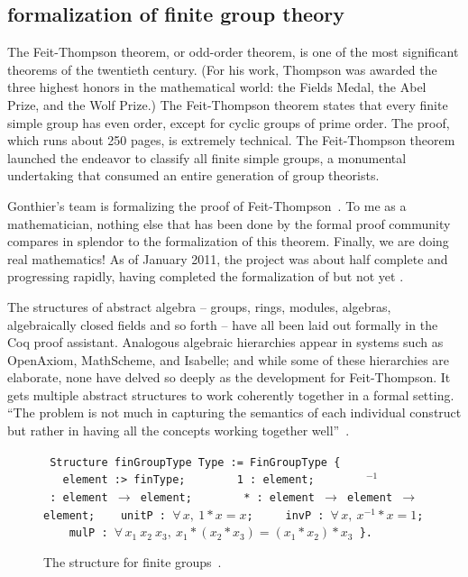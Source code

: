 \documentclass{llncs}
\begin{document}
\subsection{formalization of finite group theory}



The Feit-Thompson theorem, or odd-order theorem, is one of the most
significant theorems of the twentieth century.  (For his work,
Thompson was awarded the three highest honors in
the mathematical world: the Fields Medal, the Abel Prize, and the Wolf
Prize.)  The Feit-Thompson theorem states that every finite simple
group has even order, except for cyclic groups of prime order.  The
proof, which runs about 250 pages, is extremely technical.  The
Feit-Thompson theorem launched the endeavor to classify all finite
simple groups, a monumental undertaking that consumed an entire
generation of group theorists.


Gonthier's team is formalizing the proof of Feit-Thompson~\cite{gonMF}.
To me as a mathematician, nothing else that has been done by the formal
proof community compares in splendor to the formalization of this
theorem.  Finally, we are doing real mathematics!  As of January 2011,
the project was about half complete and progressing rapidly, having
completed the formalization of \cite{BG94} but not yet \cite{P00}.

The structures of abstract algebra -- groups, rings, modules,
algebras, algebraically closed fields and so forth -- have all been
laid out formally in the Coq proof assistant.  Analogous algebraic
hierarchies appear in systems such as OpenAxiom, MathScheme, and
Isabelle; and while some of these hierarchies are elaborate, none have
delved so deeply as the development for Feit-Thompson.
It gets multiple abstract structures to work coherently
together in a formal setting. ``The problem is not much in capturing
the semantics of each individual construct but rather in having all
the concepts working together well''~\cite{gonMF}. 


\begin{figure}
{

\obeylines\tt
Structure~finGroupType~Type~:= FinGroupType \{
~~~element~:>~finType;
~~~~~~~1~:~element;
~~~~~~\hskip0.8mm ${}^{-1}$~:~element $\to$ element;
~~~~~~~*~:~element $\to$ element $\to$ element;
~~~unitP~:~$\forall\,x,~1*x = x$;
~~~~invP~:~$\forall\,x,~x^{-1} * x = 1$;
~~~~mulP~:~$\forall\,x_1~x_2~x_3,~ x_1 * (x_2 * x_3) = (x_1 * x_2) * x_3$
\}.

}
\caption{The structure for finite groups~\cite{gonMF}.}
\label{fig:group}
\end{figure}
\end{document}

